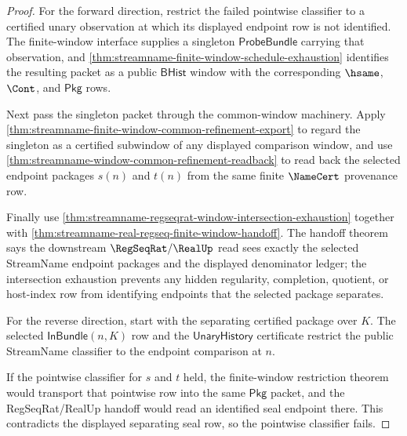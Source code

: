 \begin{proof}
For the forward direction, restrict the failed pointwise classifier to a
certified unary observation at which its displayed endpoint row is not
identified. The finite-window interface supplies a singleton
$\mathsf{ProbeBundle}$ carrying that observation, and
\autoref{thm:streamname-finite-window-schedule-exhaustion} identifies the
resulting packet as a public $\mathsf{BHist}$ window with the corresponding
$\hsame$, $\Cont$, and $\mathsf{Pkg}$ rows.

Next pass the singleton packet through the common-window machinery. Apply
\autoref{thm:streamname-finite-window-common-refinement-export} to regard the
singleton as a certified subwindow of any displayed comparison window, and use
\autoref{thm:streamname-window-common-refinement-readback} to read back the
selected endpoint packages $s(n)$ and $t(n)$ from the same finite
$\NameCert$ provenance row.

Finally use
\autoref{thm:streamname-regseqrat-window-intersection-exhaustion} together
with \autoref{thm:streamname-real-regseq-finite-window-handoff}. The handoff
theorem says the downstream $\RegSeqRat/\RealUp$ read sees exactly the selected
StreamName endpoint packages and the displayed denominator ledger; the
intersection exhaustion prevents any hidden regularity, completion, quotient,
or host-index row from identifying endpoints that the selected package
separates.

For the reverse direction, start with the separating certified package over
$K$. The selected $\mathsf{InBundle}(n,K)$ row and the
$\mathsf{UnaryHistory}$ certificate restrict the public StreamName classifier
to the endpoint comparison at $n$.

If the pointwise classifier for $s$ and $t$ held, the finite-window
restriction theorem would transport that pointwise row into the same
$\mathsf{Pkg}$ packet, and the RegSeqRat/RealUp handoff would read an
identified seal endpoint there. This contradicts the displayed separating seal
row, so the pointwise classifier fails.
\end{proof}

